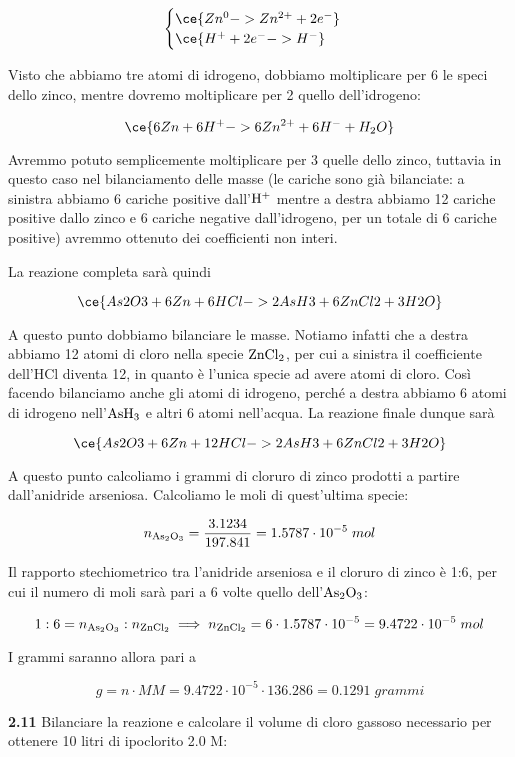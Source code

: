 $$\begin{cases}
    \ce{Zn^{0} -> Zn^{2+} + 2e^-}\\
    \ce{H^+ + 2e^- -> H^-}
\end{cases}$$

Visto che abbiamo tre atomi di idrogeno, dobbiamo moltiplicare per 6 le speci dello zinco, mentre dovremo moltiplicare per 2 quello dell'idrogeno:

$$\ce{6Zn + 6H^+ -> 6Zn^{2+} + 6H^- + H_2O}$$

Avremmo potuto semplicemente moltiplicare per 3 quelle dello zinco, tuttavia in questo caso nel bilanciamento delle masse (le cariche sono già bilanciate: a sinistra abbiamo 6 cariche positive dall'$\rm H^+$ mentre a destra abbiamo 12 cariche positive dallo zinco e 6 cariche negative dall'idrogeno, per un totale di 6 cariche positive) avremmo ottenuto dei coefficienti non interi.

La reazione completa sarà quindi 

$$\ce{As2O3 + 6Zn + 6HCl -> 2AsH3 + 6ZnCl2 + 3H2O}$$

A questo punto dobbiamo bilanciare le masse. Notiamo infatti che a destra abbiamo 12 atomi di cloro nella specie $\rm ZnCl_2$, per cui a sinistra il coefficiente dell'HCl diventa 12, in quanto è l'unica specie ad avere atomi di cloro. Così facendo bilanciamo anche gli atomi di idrogeno, perché a destra abbiamo 6 atomi di idrogeno nell'$\rm AsH_3$ e altri 6 atomi nell'acqua. La reazione finale dunque sarà

$$\ce{As2O3 + 6Zn + 12HCl -> 2AsH3 + 6ZnCl2 + 3H2O}$$

A questo punto calcoliamo i grammi di cloruro di zinco prodotti a partire dall'anidride arseniosa. Calcoliamo le moli di quest'ultima specie:

$$n_{\rm As_2O_3}=\frac{3.1234}{197.841}
=1.5787 \cdot 10^{-5}\;mol$$

Il rapporto stechiometrico tra l'anidride arseniosa e il cloruro di zinco è 1:6, per cui il numero di moli sarà pari a 6 volte quello dell'$\rm As_2O_3$:

$$1:6=n_{\rm As_2O_3}:n_{\rm ZnCl_2}
\implies
n_{\rm ZnCl_2}=6 \cdot 1.5787 \cdot 10^{-5}
=9.4722 \cdot 10^{-5}\;mol$$

I grammi saranno allora pari a 

$$g=n \cdot MM
=9.4722 \cdot 10^{-5} \cdot 136.286
=0.1291\;grammi$$

\vspace{0.2cm}\textbf{2.11} Bilanciare la reazione e calcolare il volume di cloro gassoso necessario per ottenere 10 litri di ipoclorito 2.0 M:

